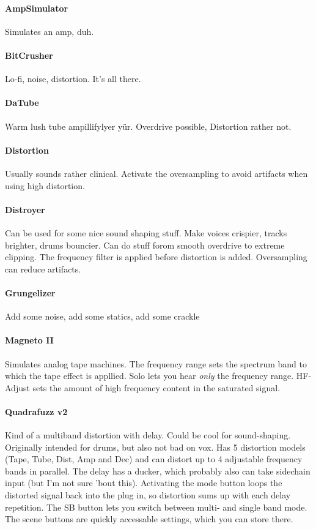 \documentclass[10pt]{article}
\begin{document}
\paragraph{AmpSimulator} Simulates an amp, duh.

\paragraph{BitCrusher} Lo-fi, noise, distortion. It's all there.

\paragraph{DaTube} Warm lush tube ampillifylyer yür. Overdrive possible, Distortion rather not.

\paragraph{Distortion} Usually sounds rather clinical. Activate the oversampling to avoid artifacts when using high distortion.

\paragraph{Distroyer} Can be used for some nice sound shaping stuff. Make voices crispier, tracks brighter, drums bouncier. Can do stuff forom smooth overdrive to extreme clipping. The frequency filter is applied before distortion is added. Oversampling can reduce artifacts.

\paragraph{Grungelizer} Add some noise, add some statics, add some crackle

\paragraph{Magneto II} Simulates analog tape machines. The frequency range sets the spectrum band to which the tape effect is appllied. Solo lets you hear \textit{only} the frequency range. HF-Adjust sets the amount of high frequency content in the saturated signal.

\paragraph{Quadrafuzz v2} Kind of a multiband distortion with delay. Could be cool for sound-shaping. Originally intended for drums, but also not bad on vox. Has 5 distortion models (Tape, Tube, Dist, Amp and Dec) and can distort up to 4 adjustable frequency bands in parallel. The delay has a ducker, which probably also can take sidechain input (but I'm not sure 'bout this). Activating the mode button loops the distorted signal back into the plug in, so distortion sums up with each delay repetition.
The SB button lets you switch between multi- and single band mode. The scene buttons are quickly accessable settings, which you can store there.
\end{document}
